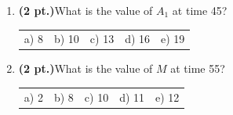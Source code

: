 \documentclass{article}
\begin{document}
\begin{enumerate}
\item {\bf (2 pt.)}What is the value of $A_1$ at time 45?

\begin{tabular}{p{0.6in} p{0.6in} p{0.6in} p{0.6in} l}
a) 8 & b) 10 & c) 13 & d) 16 & e) 19
\end{tabular}

\item {\bf (2 pt.)}What is the value of $M$ at time 55?

\begin{tabular}{p{0.6in} p{0.6in} p{0.6in} p{0.6in} l}
a) 2 & b) 8 & c) 10 & d) 11 & e) 12
\end{tabular}

\end{enumerate}
\end{document}
